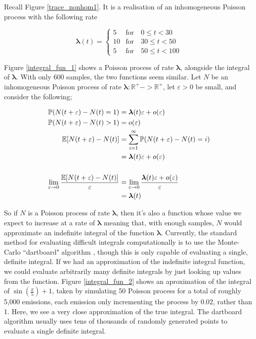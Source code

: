 Recall Figure \ref{trace_nonhom1}. It is a realisation of an inhomogeneous Poisson process with the following rate

$$
\bm{\lambda}(t) = 
\begin{cases}
5  & \mbox{for} \quad 0  \leqslant t < 30\\
10 & \mbox{for} \quad 30 \leqslant t < 50\\
5  & \mbox{for} \quad 50 \leqslant t < 100
\end{cases}
$$

Figure \ref{integral_fun_1} shows a Poisson process of rate $\bm{\lambda}$, alongside the integral of $\bm{\lambda}$. With only 600 samples, the two functions seem similar. Let $N$ be an inhomogeneous Poisson process of rate $\bm{\lambda}: \mathbb{R}^{+}->\mathbb{R}^{+}$, let $\varepsilon > 0$ be small, and consider the following;

\begin{align*}
\mathbb{P} (N(t+\varepsilon )-N(t) = 1) &= \bm{\lambda}(t)\varepsilon  + o(\varepsilon )\\
\mathbb{P} (N(t+\varepsilon )-N(t) > 1) &= o(\varepsilon )\\
\mathbb{E}[N(t+\varepsilon )-N(t)] &= \sum_{i=1}^\infty \mathbb{P} (N(t+\varepsilon )-N(t) = i)\\
&= \bm{\lambda}(t)\varepsilon  + o(\varepsilon )\\
\\
\lim_{\varepsilon ->0} \frac{\mathbb{E}[N(t+\varepsilon )-N(t)]}{\varepsilon } &= \lim_{\varepsilon ->0} \frac{\bm{\lambda}(t)\varepsilon  + o(\varepsilon )}{\varepsilon }\\
&= \bm{\lambda}(t)
\end{align*}

So if $N$ is a Poisson process of rate $\bm{\lambda}$, then it's also a function whose value we expect to increase at a rate of $\bm{\lambda}$ meaning that, with enough samples, $N$ would approximate an indefinite integral of the function $\bm{\lambda}$. Currently, the standard method for evaluating difficult integrals computationally is to use the Monte-Carlo ``dartboard" algorithm \cite[]{montecarlo}, though this is only capable of evaluating a single, definite integral. If we had an approximation of the indefinite integral function, we could evaluate arbitrarily many definite integrals by just looking up values from the function. Figure \ref{integral_fun_2} shows an aproximation of the integral of $\sin\left(\frac{x}{5}\right)+1$, taken by simulating 50 Poisson process for a total of roughly 5,000 emissions, each emission only incrementing the process by $0.02$, rather than 1. Here, we see a very close approximation of the true integral. The dartboard algorithm usually uses tens of thousands of randomly generated points to evaluate a single definite integral.

